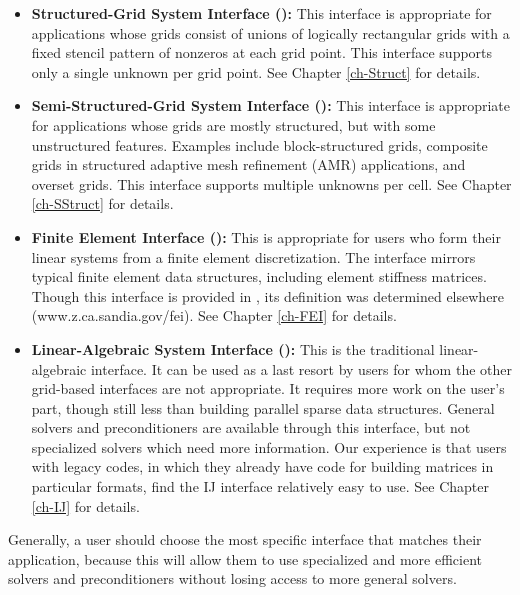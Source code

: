 \begin{itemize}

\item
{\bf Structured-Grid System Interface ():} This interface is
appropriate for applications whose grids consist of unions of logically
rectangular grids with a fixed stencil pattern of nonzeros at each grid point.
This interface supports only a single unknown per grid point.  See Chapter
\ref{ch-Struct} for details.

\item
{\bf Semi-Structured-Grid System Interface ():} This
interface is appropriate for applications whose grids are mostly
structured, but with some unstructured features.  Examples include
block-structured grids, composite grids in structured adaptive mesh
refinement (AMR) applications, and overset grids.  This interface
supports multiple unknowns per cell.
See Chapter \ref{ch-SStruct} for details.

\item
{\bf Finite Element Interface ():} This is appropriate for
users who form their linear systems from a finite element
discretization.  The interface mirrors typical finite element data
structures, including element stiffness matrices.  Though this
interface is provided in \hypre{}, its definition was determined
elsewhere (www.z.ca.sandia.gov/fei).
See Chapter \ref{ch-FEI} for details.

\item
{\bf Linear-Algebraic System Interface ():} This is the
traditional linear-algebraic interface.  It can be used as a last
resort by users for whom the other grid-based interfaces are not
appropriate.  It requires more work on the user's part, though still
less than building parallel sparse data structures.  General solvers
and preconditioners are available through this interface, but not
specialized solvers which need more information.  Our experience is
that users with legacy codes, in which they already have code for
building matrices in particular formats, find the IJ interface
relatively easy to use.
See Chapter \ref{ch-IJ} for details.

\end{itemize}

Generally, a user should choose the most specific interface that
matches their application, because this will allow them to use
specialized and more efficient solvers and preconditioners without
losing access to more general solvers.
